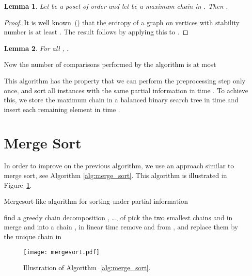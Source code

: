 \documentclass{article} \usepackage{fullpage}
\newtheorem{lemma}{Lemma}
\begin{document}
\begin{lemma}
\label{lem:bigchain}
Let  be a poset of order  and let  be a maximum chain in . Then .
\end{lemma}
\begin{proof}
It is well known~(\cite{K86,CFJ07}) that the entropy of a graph on  vertices with stability number  is at least .
The result follows by applying this to .
\end{proof}

\begin{lemma}
\label{lem:redfac}
For all , .
\end{lemma}

Now the number of comparisons performed by the algorithm is at most


This algorithm has the property that we can perform the preprocessing step only once, and sort all instances with the same partial information in time . To achieve this, we store the maximum chain  in a balanced binary search tree in time  and insert each remaining element in time .

\section{Merge Sort}
\label{sec:merge}

In order to improve on the previous algorithm, we use an approach similar to merge sort, see Algorithm \ref{alg:merge_sort}. This algorithm is illustrated in Figure~\ref{fig:merge_sort}.

\begin{algorithm}
\caption{Mergesort-like algorithm for sorting under partial information} \label{alg:merge_sort}
\begin{algorithmic}
\STATE {}
\STATE find a greedy chain decomposition , \ldots,  of 
\STATE 
\STATE {}
\WHILE{}
\STATE pick the two smallest chains  and  in 
\STATE merge  and  into a chain , in linear time
\STATE remove  and  from , and replace them by 
\ENDWHILE
\RETURN the unique chain in 
\end{algorithmic}
\end{algorithm}

\begin{figure}
\begin{center}
\texttt{[image: mergesort.pdf]}
\end{center}
\caption{\label{fig:merge_sort}Illustration of Algorithm~\ref{alg:merge_sort}.}
\end{figure}
\end{document}
